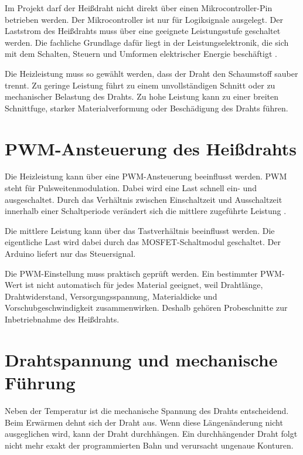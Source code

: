Im Projekt darf der Heißdraht nicht direkt über einen Mikrocontroller-Pin betrieben werden. Der Mikrocontroller ist nur für Logiksignale ausgelegt. Der Laststrom des Heißdrahts muss über eine geeignete Leistungsstufe geschaltet werden. Die fachliche Grundlage dafür liegt in der Leistungselektronik, die sich mit dem Schalten, Steuern und Umformen elektrischer Energie beschäftigt \cite{Zach:2022}.

Die Heizleistung muss so gewählt werden, dass der Draht den Schaumstoff sauber trennt. Zu geringe Leistung führt zu einem unvollständigen Schnitt oder zu mechanischer Belastung des Drahts. Zu hohe Leistung kann zu einer breiten Schnittfuge, starker Materialverformung oder Beschädigung des Drahts führen.

\section{PWM-Ansteuerung des Heißdrahts}
\label{sec:pwm_ansteuerung_Heißdraht}

Die Heizleistung kann über eine PWM-Ansteuerung beeinflusst werden. PWM steht für Pulsweitenmodulation. Dabei wird eine Last schnell ein- und ausgeschaltet. Durch das Verhältnis zwischen Einschaltzeit und Ausschaltzeit innerhalb einer Schaltperiode verändert sich die mittlere zugeführte Leistung \cite{DeDoncker:2024}.

Die mittlere Leistung kann über das Tastverhältnis beeinflusst werden. Die eigentliche Last wird dabei durch das MOSFET-Schaltmodul geschaltet. Der Arduino liefert nur das Steuersignal.

Die PWM-Einstellung muss praktisch geprüft werden. Ein bestimmter PWM-Wert ist nicht automatisch für jedes Material geeignet, weil Drahtlänge, Drahtwiderstand, Versorgungsspannung, Materialdicke und Vorschubgeschwindigkeit zusammenwirken. Deshalb gehören Probeschnitte zur Inbetriebnahme des Heißdrahts.

\section{Drahtspannung und mechanische Führung}
\label{sec:drahtspannung_mechanische_fuehrung}

Neben der Temperatur ist die mechanische Spannung des Drahts entscheidend. Beim Erwärmen dehnt sich der Draht aus. Wenn diese Längenänderung nicht ausgeglichen wird, kann der Draht durchhängen. Ein durchhängender Draht folgt nicht mehr exakt der programmierten Bahn und verursacht ungenaue Konturen.

